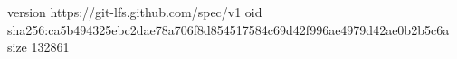 version https://git-lfs.github.com/spec/v1
oid sha256:ca5b494325ebc2dae78a706f8d854517584c69d42f996ae4979d42ae0b2b5c6a
size 132861
